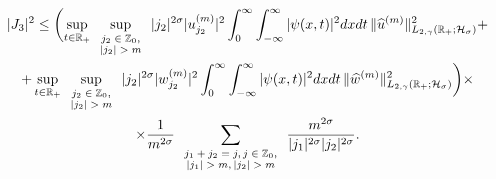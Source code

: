 \begin{multline*}

|J_3|^2\le 

\biggl(

\sup_{t\in \mathbb R_{+}}

\sup_{

\scriptsize

\begin{array}{c}

j_2\in \mathbb Z_0, \\ 

|j_2|> m 

\end{array}

} |j_2|^{2\sigma} |u_{j_2}^{(m)}|^2

\int_0^\infty \int_{-\infty}^\infty

|\psi(x,t)|^2 dxdt \, \|\widehat{u}^{(m)}\|^2_{L_{2,\gamma}(\mathbb R_{+}; {\cal H}_{\sigma})}+

\\

+  \sup_{t\in \mathbb R_{+}}\sup_{

\scriptsize

\begin{array}{c}

j_2\in \mathbb Z_0,\\ 

|j_2|> m

\end{array}

} |j_2|^{2\sigma} |w_{j_2}^{(m)}|^2

\int_0^\infty \int_{-\infty}^\infty  |\psi(x,t)|^2 dxdt \, \|\widehat{w}^{(m)}\|^2_{L_{2,\gamma}(\mathbb R_{+}; {\cal H}_{\sigma})} \biggr)\times

\\

\times \frac{1}{m^{2\sigma}}\sum_{

\scriptsize

\begin{array}{c}

j_1+j_2=j,j\in \mathbb Z_0, \\ |j_1|>m, |j_2|> m

\end{array}

} \frac{m^{2\sigma}}{|j_1|^{2\sigma}|j_2|^{2\sigma}}.

\end{multline*}



